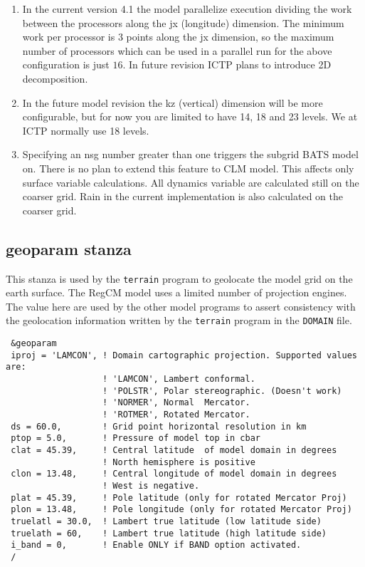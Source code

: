 \begin{enumerate}
\item In the current version 4.1 the model parallelize execution dividing
the work between the processors along the jx (longitude) dimension. The
minimum work per processor is 3 points along the jx dimension, so the maximum
number of processors which can be used in a parallel run for the above
configuration is just $16$. In future revision ICTP plans to introduce 2D
decomposition.
\item In the future model revision the kz (vertical) dimension will be
more configurable, but for now you are limited to have 14, 18 and 23 levels.
We at ICTP normally use 18 levels.
\item Specifying an nsg number greater than one triggers the subgrid BATS model
on. There is no plan to extend this feature to CLM model. This affects only
surface variable calculations. All dynamics variable are calculated still
on the coarser grid. Rain in the current implementation is also calculated on
the coarser grid.
\end{enumerate}

\subsection{geoparam stanza}
\label{geoparam}

This stanza is used by the \verb=terrain= program to geolocate the model grid
on the earth surface. The RegCM model uses a limited number of projection
engines. The value here are used by the other model programs to assert
consistency with the geolocation information written by the \verb=terrain=
program in the \verb=DOMAIN= file.

{\footnotesize
\begin{Verbatim}
 &geoparam
 iproj = 'LAMCON', ! Domain cartographic projection. Supported values are:
                   ! 'LAMCON', Lambert conformal.
                   ! 'POLSTR', Polar stereographic. (Doesn't work)
                   ! 'NORMER', Normal  Mercator.
                   ! 'ROTMER', Rotated Mercator.
 ds = 60.0,        ! Grid point horizontal resolution in km
 ptop = 5.0,       ! Pressure of model top in cbar
 clat = 45.39,     ! Central latitude  of model domain in degrees
                   ! North hemisphere is positive
 clon = 13.48,     ! Central longitude of model domain in degrees
                   ! West is negative.
 plat = 45.39,     ! Pole latitude (only for rotated Mercator Proj)
 plon = 13.48,     ! Pole longitude (only for rotated Mercator Proj)
 truelatl = 30.0,  ! Lambert true latitude (low latitude side)
 truelath = 60,    ! Lambert true latitude (high latitude side)
 i_band = 0,       ! Enable ONLY if BAND option activated.
 /
\end{Verbatim}
}

